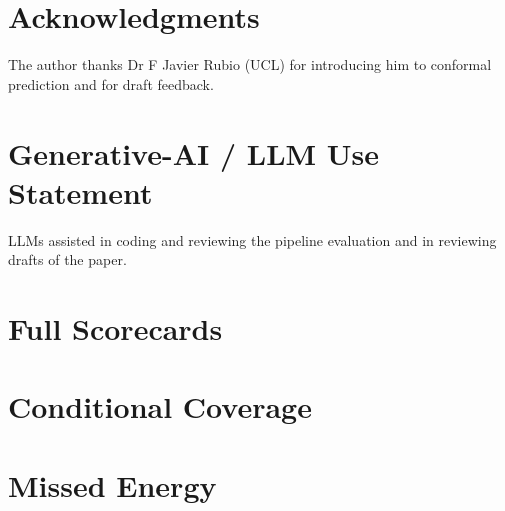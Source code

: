 \documentclass{article}
\newcommand{\results}[1]{}
\begin{document}
\section*{Acknowledgments} 
The author thanks Dr F Javier Rubio (UCL) for introducing him to conformal prediction and for draft feedback.

\section*{Generative-AI / LLM Use Statement} 
LLMs assisted in coding and reviewing the pipeline evaluation and in reviewing drafts of the paper.


\newpage



\clearpage
\appendix
\raggedbottom


\section{Full Scorecards}
\label{app:scorecards}

\begin{table}[H]
\caption{Full scorecard, Kelmarsh 2024 ($N$ = 5,652-5,911 per cell, target $1-\alpha = 0.90$).}
\label{tab:kelmarsh}
\centering
\resizebox{\linewidth}{!}{\results{table_scorecard_kelmarsh.tex}}
\end{table}

\begin{table}[H]
\caption{Full scorecard, Penmanshiel 2023 ($N$ = 6,668-6,746 per cell, target $1-\alpha = 0.90$).}
\label{tab:penmanshiel}
\centering
\resizebox{\linewidth}{!}{\results{table_scorecard_penmanshiel.tex}}
\end{table}

\clearpage


\section{Conditional Coverage}
\label{app:conditional}

\begin{table}[H]
\caption{Coverage by forecast wind band at 24 hours, native versus wrapped, both farms.}
\label{tab:bands}
\centering
\resizebox{\linewidth}{!}{\results{table_coverage_by_band.tex}}
\end{table}

\section{Missed Energy}
\label{app:exposure}
\end{document}
